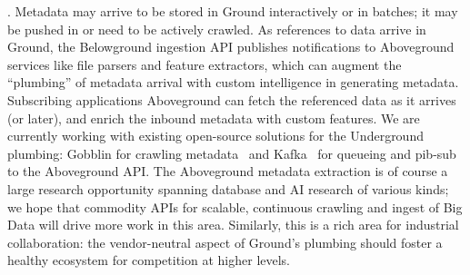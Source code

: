 \documentclass{sig-alternate}
\begin{document}
.  Metadata may arrive to be stored in Ground interactively or in batches; it may be pushed in or need to be actively crawled.  
As references to data arrive in Ground, the Belowground ingestion API publishes notifications to Aboveground services like file parsers and feature extractors, which can augment the ``plumbing'' of metadata arrival with custom intelligence in generating metadata.  Subscribing applications Aboveground can fetch the referenced data as it arrives (or later), and enrich the inbound metadata with custom features.  We are currently working with existing open-source solutions for the Underground plumbing: Gobblin for crawling metadata~\cite{gobblin} and Kafka~\cite{kafka} for queueing and pib-sub to the Aboveground API. The Aboveground metadata extraction is of course a large research opportunity spanning database and AI research of various kinds; we hope that commodity APIs for scalable, continuous crawling and ingest of Big Data will drive more work in this area. Similarly, this is a rich area for industrial collaboration: the vendor-neutral aspect of Ground's plumbing should foster a healthy ecosystem for competition at higher levels.

\end{document}
